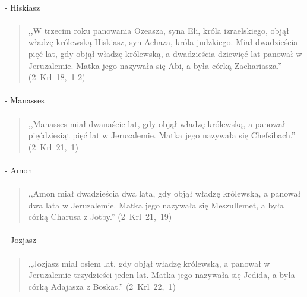 \documentclass[10pt,a4paper,oneside]{article}
\begin{document}
\paragraph{}
- Hiskiasz
\paragraph{}
\begin{quote}
,,W trzecim roku panowania Ozeasza, syna Eli, króla izraelskiego, objął władzę królewską Hiskiasz, syn Achaza, króla judzkiego. Miał dwadzieścia pięć lat, gdy objął władzę królewską, a dwadzieścia dziewięć lat panował w Jeruzalemie. Matka jego nazywała się Abi, a była córką Zachariasza.'' \mbox{(2 Krl 18, 1-2)}
\end{quote}
\paragraph{}
- Manasses
\paragraph{}
\begin{quote}
,,Manasses miał dwanaście lat, gdy objął władzę królewską, a panował pięćdziesiąt pięć lat w Jeruzalemie. Matka jego nazywała się Chefsibach.'' \mbox{(2 Krl 21, 1)}
\end{quote}
\paragraph{}
- Amon
\paragraph{}
\begin{quote}
,,Amon miał dwadzieścia dwa lata, gdy objął władzę królewską, a panował dwa lata w Jeruzalemie. Matka jego nazywała się Meszullemet, a była córką Charusa z Jotby.'' \mbox{(2 Krl 21, 19)}
\end{quote}
\paragraph{}
- Jozjasz
\paragraph{}
\begin{quote}
,,Jozjasz miał osiem lat, gdy objął władzę królewską, a panował w Jeruzalemie trzydzieści jeden lat. Matka jego nazywała się Jedida, a była córką Adajasza z Boskat.'' \mbox{(2 Krl 22, 1)}
\end{quote}
\end{document}
